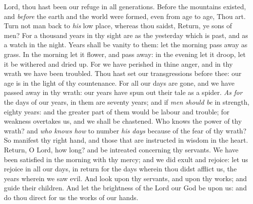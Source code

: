 \documentclass[10pt,letterpaper]{letter}
\begin{document}
 
Lord, thou hast been our refuge in all generations. Before the mountains existed, and \textit{before} the earth and the world were formed, even from age to age, Thou art. Turn not man back to \textit{his} low place, whereas thou saidst, Return, ye sons of men? For a thousand years in thy sight are as the yesterday which is past, and as a watch in the night. Years shall be vanity to them: let the morning pass away as grass. In the morning let it flower, and pass away: in the evening let it droop, let it be withered and dried up. For we have perished in thine anger, and in thy wrath we have been troubled. Thou hast set our transgressions before thee: our age is in the light of thy countenance. For all our days are gone, and we have passed away in thy wrath: our years have spun out their tale as a spider. \textit{As for} the days of our years, in them are seventy years; and if \textit{men should be} in strength, eighty years: and the greater part of them would be labour and trouble; for weakness overtakes us, and we shall be chastened. Who knows the power of thy wrath? and \textit{who knows how} to number \textit{his days} because of the fear of thy wrath? So manifest thy right hand, and those that are instructed in wisdom in the heart.\\

\noindent
Return, O Lord, how long? and be intreated concerning thy servants. We have been satisfied in the morning with thy mercy; and we did exult and rejoice: let us rejoice in all our days, in return for the days wherein thou didst afflict us, the years wherein we saw evil. And look upon thy servants, and upon thy works; and guide their children. And let the brightness of the Lord our God be upon us: and do thou direct for us the works of our hands.
\end{document}
